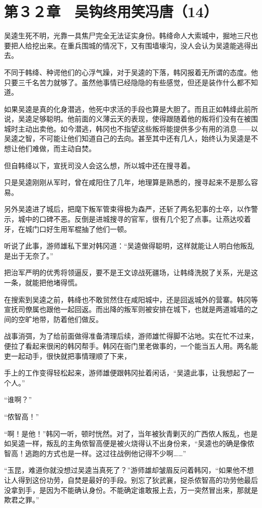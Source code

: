 \section{第３２章　吴钩终用笑冯唐（14）}

吴逵生死不明，光靠一具焦尸完全无法证实身份。韩绛命人大索城中，掘地三尺也要把人给挖出来。在重兵围城的情况下，又有围墙壕沟，没人会认为吴逵能逃得出去。

不同于韩绛、种谔他们的心浮气躁，对于吴逵的下落，韩冈报着无所谓的态度。他只要三千名苦力就够了。虽然他事情已经隐隐的有些感觉，但还是装作什么都不知道。

如果吴逵是真的化身潜逃，他死中求活的手段也算是大胆了。而且正如韩绛此前所说，吴逵足够聪明。他前面的义薄云天的表现，使得跟随着他的叛将们没有在被围城时主动出卖他。如今潜逃，韩冈也不指望这些叛将能提供多少有用的消息——以吴逵之智，不可能让他们知道自己的去向。甚至其中还有几人，始终认为吴逵是不想让他们难做，而主动自焚。

但自韩绛以下，宣抚司没人会这么想，所以城中还在搜寻着。

只是吴逵刚刚从军时，曾在咸阳住了几年，地理算是熟悉的，搜寻起来不是那么容易。

另外吴逵进了城后，把麾下叛军管束得极为森严，还斩了两名犯事的士卒，以作警示，城中的口碑不恶。反倒是进城搜寻的官军，很有几个犯了点事。让燕达咬着牙，在城门口好生用军棍抽了他们一顿。

听说了此事，游师雄私下里对韩冈道：“吴逵做得聪明，这样就能让人明白他叛乱是出于无奈了。”

把治军严明的优秀将领逼反，要不是王文谅战死疆场，让韩绛洗脱了关系，光是这一条，就能把他堵得慌。

在搜索到吴逵之前，韩绛也不敢贸然住在咸阳城中，还是回返城外的营寨。韩冈等宣抚司僚属也跟他一起回返。而出降的叛军则被安排在城下，也就是两道城墙的之间的空旷地带，防着他们做反。

战事消弭，为了给前面做得准备清理后续，游师雄忙得脚不沾地。实在忙不过来，便拉了看起来很闲的韩冈帮手。韩冈在衙门里老做事的，一个能当五人用。两名能吏一起动手，很快就把事情理顺了下来，

手上的工作变得轻松起来，游师雄便跟韩冈扯着闲话，“吴逵此事，让我想起了一个人。”

“谁啊？”

“侬智高！”

“啊！是他！”韩冈一听，顿时恍然。对了，当年被狄青剿灭的广西侬人叛乱，也是如吴逵一样，叛乱的主角侬智高便是被火烧得认不出身份来，“吴逵也的确是像侬智高！逃跑的方式也是一样。这过往战例他记得不少啊……”

“玉昆，难道你就没想过吴逵当真死了？”游师雄却皱眉反问着韩冈，“如果他不想让人得到这份功劳，自焚是最好的手段。别忘了狄武襄，捉杀侬智高的功劳他最后没拿到手，是因为不能确认身份。不能确定谁敢报上去，万一突然冒出来，那就是欺君之罪。”

